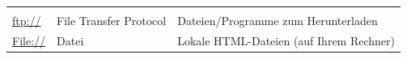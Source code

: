 \documentclass[]{book}
\theoremstyle{definition}
\theoremstyle{definition}
\theoremstyle{definition}
\theoremstyle{remark}
\begin{document}
\begin{longtable}[]{@{}lll@{}}
\begin{minipage}[t]{0.33\columnwidth}
\end{minipage}\tabularnewline
\begin{minipage}[t]{0.31\columnwidth}\raggedright\strut
\url{ftp://} \vspace{5mm}\strut
\end{minipage} & \begin{minipage}[t]{0.27\columnwidth}\raggedright\strut
File Transfer Protocol \vspace{5mm}\strut
\end{minipage} & \begin{minipage}[t]{0.33\columnwidth}\raggedright\strut
Dateien/Programme zum Herunterladen \vspace{5mm}\strut
\end{minipage}\tabularnewline
\begin{minipage}[t]{0.31\columnwidth}\raggedright\strut
\url{File://} \vspace{5mm}\strut
\end{minipage} & \begin{minipage}[t]{0.27\columnwidth}\raggedright\strut
Datei \vspace{5mm}\strut
\end{minipage} & \begin{minipage}[t]{0.33\columnwidth}\raggedright\strut
Lokale HTML-Dateien (auf Ihrem Rechner) \vspace{5mm}\strut
\end{minipage}\tabularnewline
\bottomrule
\end{longtable}
\end{document}
